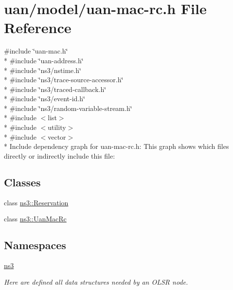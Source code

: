 \hypertarget{uan-mac-rc_8h}{}\section{uan/model/uan-\/mac-\/rc.h File Reference}
\label{uan-mac-rc_8h}
{\ttfamily \#include \char`\"{}uan-\/mac.\+h\char`\"{}}\\*
{\ttfamily \#include \char`\"{}uan-\/address.\+h\char`\"{}}\\*
{\ttfamily \#include \char`\"{}ns3/nstime.\+h\char`\"{}}\\*
{\ttfamily \#include \char`\"{}ns3/trace-\/source-\/accessor.\+h\char`\"{}}\\*
{\ttfamily \#include \char`\"{}ns3/traced-\/callback.\+h\char`\"{}}\\*
{\ttfamily \#include \char`\"{}ns3/event-\/id.\+h\char`\"{}}\\*
{\ttfamily \#include \char`\"{}ns3/random-\/variable-\/stream.\+h\char`\"{}}\\*
{\ttfamily \#include $<$list$>$}\\*
{\ttfamily \#include $<$utility$>$}\\*
{\ttfamily \#include $<$vector$>$}\\*
Include dependency graph for uan-\/mac-\/rc.h\+:
This graph shows which files directly or indirectly include this file\+:
\subsection*{Classes}
\begin{DoxyCompactItemize}
\item 
class \hyperlink{classns3_1_1Reservation}{ns3\+::\+Reservation}
\item 
class \hyperlink{classns3_1_1UanMacRc}{ns3\+::\+Uan\+Mac\+Rc}
\end{DoxyCompactItemize}
\subsection*{Namespaces}
\begin{DoxyCompactItemize}
\item 
 \hyperlink{namespacens3}{ns3}
\begin{DoxyCompactList}\small\item\em Here are defined all data structures needed by an O\+L\+SR node. \end{DoxyCompactList}\end{DoxyCompactItemize}
